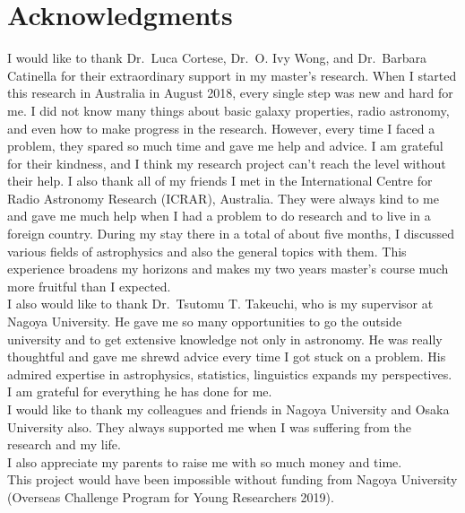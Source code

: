 \chapter*{\Large Acknowledgments}

I would like to thank Dr.\ Luca Cortese, Dr.\ O. Ivy Wong, and Dr.\ Barbara Catinella for their extraordinary support in my master's research.
When I started this research in Australia in August 2018, every single step was new and hard for me.
I did not know many things about basic galaxy properties, radio astronomy, and even how to make progress in the research.
However, every time I faced a problem, they spared so much time and gave me help and advice.
I am grateful for their kindness, and I think my research project can't reach the level without their help.
I also thank all of my friends I met in the International Centre for Radio Astronomy Research (ICRAR), Australia.
They were always kind to me and gave me much help when I had a problem to do research and to live in a foreign country.
During my stay there in a total of about five months, I discussed various fields of astrophysics and also the general topics with them.
This experience broadens my horizons and makes my two years master's course much more fruitful than I expected. \\
I also would like to thank Dr.\ Tsutomu T. Takeuchi, who is my supervisor at Nagoya University.
He gave me so many opportunities to go the outside university and to get extensive knowledge not only in astronomy.
He was really thoughtful and gave me shrewd advice every time I got stuck on a problem.
His admired expertise in astrophysics, statistics, linguistics expands my perspectives.
I am grateful for everything he has done for me. \\
I would like to thank my colleagues and friends in Nagoya University and Osaka University also.
They always supported me when I was suffering from the research and my life. \\
I also appreciate my parents to raise me with so much money and time. \\
This project would have been impossible without funding from Nagoya University (Overseas Challenge Program for Young Researchers 2019).
